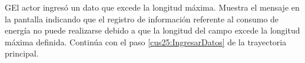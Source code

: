     \begin{UCtrayectoriaA}{G}{El actor ingresó un dato que excede la longitud máxima.}    
    \UCpaso[\UCsist] Muestra el mensaje  en la pantalla  indicando que el registro de información referente al consumo de energía no puede realizarse debido a que la longitud del campo excede la longitud máxima definida.
    \UCpaso[] Continúa con el paso \ref{cus25:IngresarDatos} de la trayectoria principal.     
    \end{UCtrayectoriaA}